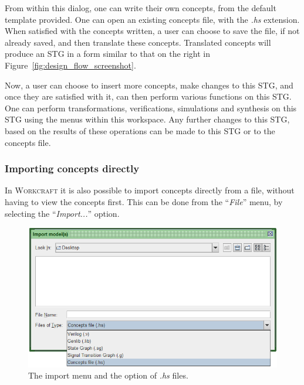 \documentclass[british,conference,compsoc]{IEEEtran}
\newcommand{\noun}[1]{\textsc{#1}}
\begin{document}
From within this dialog, one can write their own concepts, from the default 
template provided. One can open an 
existing concepts file, with the \emph{.hs} extension. When satisfied with the 
concepts written, a user can choose to save the file, if not already saved, and
then translate these concepts. Translated concepts will produce an STG in a 
form similar to that on the right in Figure~\ref{fig:design_flow_screenshot}.

Now, a user can choose to insert more 
concepts, make changes to this STG, and once they are satisfied with it, can 
then perform various functions on this STG. One can perform transformations, 
verifications, simulations and synthesis on this STG using the menus within this 
workspace. Any further changes to this STG, based on the results of these 
operations can be made to this STG or to the concepts file. 

\subsubsection{Importing concepts directly}

\vspace{-3mm}

In \noun{Workcraft} it is also possible to import concepts directly from a file,
without having to view the concepts first. This can be done from the 
``\emph{File}'' menu, by selecting the ``\emph{Import...}'' option. 

\begin{figure}[h]
\begin{centering}
\vspace{-3mm}
\includegraphics[scale=0.4]{Images/import_menu_screenshot.png}
\par\end{centering}

\begin{centering}
\protect\caption{\label{fig:import_menu_screenshot}The import menu and the 
			option of \emph{.hs} files.}

\par\end{centering}
\vspace{-6mm}
\end{figure}
\end{document}
